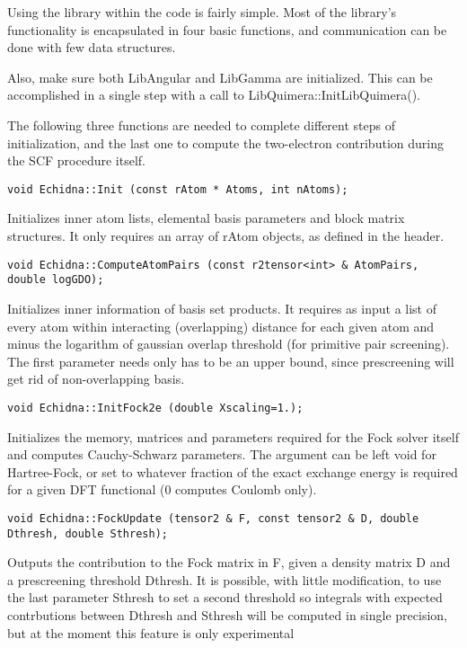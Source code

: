 \documentclass[a4paper,11pt]{paper}
\begin{document}
Using the library within the code is fairly simple. Most of the library's functionality is encapsulated in four basic functions, and communication can be done with few data structures.

Also, make sure both LibAngular and LibGamma are initialized. This can be accomplished in a single step with a call to LibQuimera::InitLibQuimera(). 

The following three functions are needed to complete different steps of initialization, and the last one to compute the two-electron contribution during the SCF procedure itself.

\begin{verbatim}
void Echidna::Init (const rAtom * Atoms, int nAtoms);
\end{verbatim}

Initializes inner atom lists, elemental basis parameters and block matrix structures. It only requires an array of rAtom objects, as defined in the header.

\begin{verbatim}
void Echidna::ComputeAtomPairs (const r2tensor<int> & AtomPairs, double logGDO);
\end{verbatim}

Initializes inner information of basis set products. It requires as input a list of every atom within interacting (overlapping) distance for each given atom and minus the logarithm of  gaussian overlap threshold (for primitive pair screening). The first parameter needs only has to be an upper bound, since prescreening will get rid of non-overlapping basis.

\begin{verbatim}
void Echidna::InitFock2e (double Xscaling=1.);
\end{verbatim}

Initializes the memory, matrices and parameters required for the Fock solver itself and computes Cauchy-Schwarz parameters. The argument can be left void for Hartree-Fock, or set to whatever fraction of the exact exchange energy is required for a given DFT functional (0 computes Coulomb only).

\begin{verbatim}
void Echidna::FockUpdate (tensor2 & F, const tensor2 & D, double Dthresh, double Sthresh);
\end{verbatim}

Outputs the contribution to the Fock matrix in F, given a density matrix D and a prescreening threshold Dthresh. It is possible, with little modification, to use the last parameter Sthresh to set a second threshold so integrals with expected contrbutions between Dthresh and Sthresh will be computed in single precision, but at the moment this feature is only experimental
\end{document}
